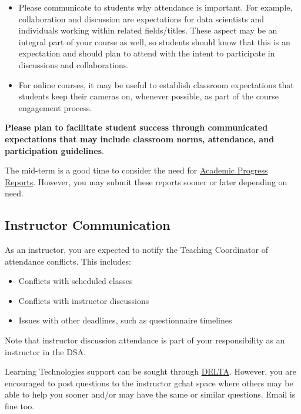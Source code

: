 \documentclass[
]{book}
\providecommand{\tightlist}{%
  \setlength{\itemsep}{0pt}\setlength{\parskip}{0pt}}
\begin{document}
\begin{itemize}
\item
  Please communicate to students why attendance is important. For example, collaboration and discussion are expectations for data scientists and individuals working within related fields/titles. These aspect may be an integral part of your course as well, so students should know that this is an expectation and should plan to attend with the intent to participate in discussions and collaborations.
\item
  For online courses, it may be useful to establish classroom expectations that students keep their cameras on, whenever possible, as part of the course engagement process.
\end{itemize}

{ \textbf{Please plan to facilitate student success through communicated expectations that may include classroom norms, attendance, and participation guidelines}. }

The mid-term is a good time to consider the need for \href{https://dasa.ncsu.edu/faculty-resources/academic-progress-reporting/}{Academic Progress Reports}. However, you may submit these reports sooner or later depending on need.

\subsection{Instructor Communication}\label{instructor-communication}

As an instructor, you are expected to notify the Teaching Coordinator of attendance conflicts. This includes:

\begin{itemize}
\tightlist
\item
  Conflicts with scheduled classes
\item
  Conflicts with instructor discussions
\item
  Issues with other deadlines, such as questionnaire timelines
\end{itemize}

Note that instructor discussion attendance is part of your responsibility as an instructor in the DSA.

Learning Technologies support can be sought through \href{https://delta.ncsu.edu/learntech-request/}{DELTA}. However, you are encouraged to post questions to the instructor gchat space where others may be able to help you sooner and/or may have the same or similar questions. Email is fine too.
\end{document}
